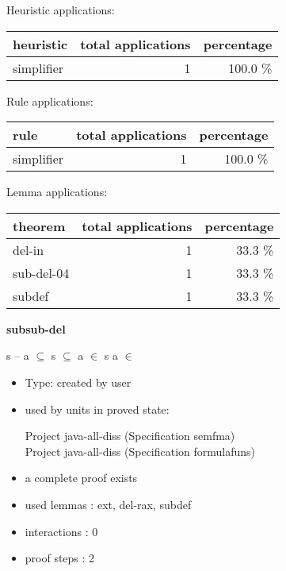 \documentclass[a4paper]{article}
\begin{document}
\medskip


Heuristic applications:

\begin{supertabular}{l|r|r}
heuristic	& total applications & percentage \\ \hline
simplifier & 1 & 100.0 \% \\

\end{supertabular}

Rule applications:

\begin{supertabular}{l|r|r}
rule	        & total applications & percentage \\ \hline
simplifier & 1 & 100.0 \% \\

\end{supertabular}

Lemma applications:

\begin{supertabular}{l|r|r}
theorem	        & total applications & percentage \\ \hline
del-in & 1 & 33.3 \% \\
sub-del-04 & 1 & 33.3 \% \\
subdef & 1 & 33.3 \% \\

\end{supertabular}
\pagebreak

{\LARGE\bf subsub-del}\label{lemma-subsub-del}

\medskip

 \Fol s -- a $\subseteq$  \And \Not s $\subseteq$  \And a $\in$ s \Imp \Not a $\in$ 

\begin{itemize}

\item Type: created by user

\item used by units in proved state:

Project java-all-diss (Specification semfma) \\
Project java-all-diss (Specification formulafuns)
\item       a complete proof exists
\item       used lemmas  : ext, del-rax, subdef
\item       interactions : 0
\item       proof steps  : 2
\end{itemize}
\end{document}
